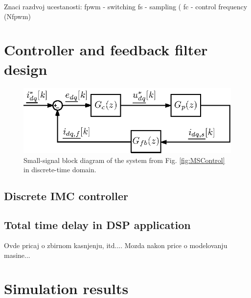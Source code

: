 \documentclass[journal]{IEEEtran}
\begin{document}
Znaci razdvoj ucestanosti:
fpwm - switching
fs - sampling (
fc - control frequency (Nfpwm)



\section{Controller and feedback filter design}

\begin{figure}[t!]
    \centerline{\includegraphics[width=0.95\linewidth]{figures/small_signal.eps}}
    \caption{Small-signal block diagram of the system from Fig. \ref{fig:MSControl} in discrete-time domain.}
    \label{fig:SmallSignal}
\end{figure}

\subsection{Discrete IMC controller}

\subsection{Total time delay in DSP application}
Ovde pricaj o zbirnom kasnjenju, itd....
Mozda nakon price o modelovanju masine...



\section{Simulation results}
\end{document}
